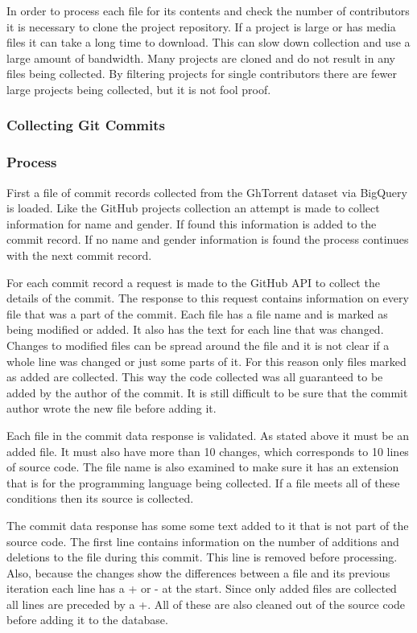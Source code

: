 \documentclass[12pt]{article}
\begin{document}
In order to process each file for its contents and check the number of contributors it is necessary to clone the project repository. If a project is large or has media files it can take a long time to download. This can slow down collection and use a large amount of bandwidth. Many projects are cloned and do not result in any files being collected. By filtering projects for single contributors there are fewer large projects being collected, but it is not fool proof.


\subsubsection{Collecting Git Commits}

\subsubsection*{Process}
First a file of commit records collected from the GhTorrent dataset via BigQuery is loaded. Like the GitHub projects collection an attempt is made to collect information for name and gender. If found this information is added to the commit record. If no name and gender information is found the process continues with the next commit record.

For each commit record a request is made to the GitHub API to collect the details of the commit. The response to this request contains information on every file that was a part of the commit. Each file has a file name and is marked as being modified or added. It also has the text for each line that was changed. Changes to modified files can be spread around the file and it is not clear if a whole line was changed or just some parts of it. For this reason only files marked as added are collected. This way the code collected was all guaranteed to be added by the author of the commit. It is still difficult to be sure that the commit author wrote the new file before adding it.

Each file in the commit data response is validated. As stated above it must be an added file. It must also have more than 10 changes, which corresponds to 10 lines of source code. The file name is also examined to make sure it has an extension that is for the programming language being collected. If a file meets all of these conditions then its source is collected.

The commit data response has some some text added to it that is not part of the source code. The first line contains information on the number of additions and deletions to the file during this commit. This line is removed before processing. Also, because the changes show the differences between a file and its previous iteration each line has a + or - at the start. Since only added files are collected all lines are preceded by a +. All of these are also cleaned out of the source code before adding it to the database.
\end{document}
